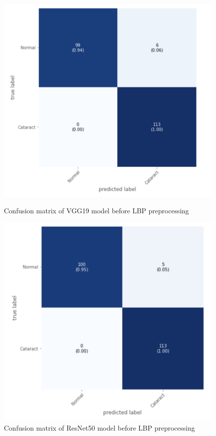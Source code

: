\documentclass{ijclclp}
\begin{document}
\begin{figure}[htbp]
    \centering
    \begin{minipage}[b]{0.48\textwidth}
    \includegraphics[width=\textwidth]{VGG.png}
    \caption{Confusion matrix of VGG19 model before LBP preprocessing}
    \end{minipage}
    \hfill
    \begin{minipage}[b]{0.48\textwidth}
    \includegraphics[width=\textwidth]{ResNet50.png}
    \caption{Confusion matrix of ResNet50 model before LBP preprocessing}
    \end{minipage}
\end{figure}
\end{document}
